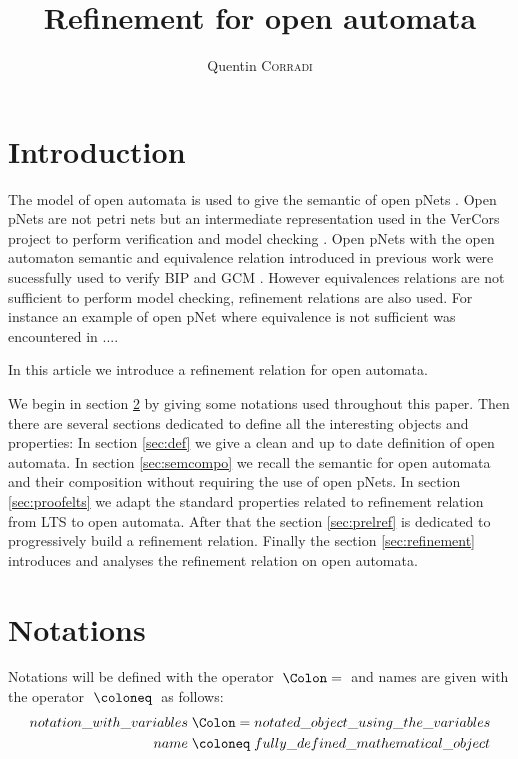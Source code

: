 \documentclass{article}
\title{Refinement for open automata}
\author{Quentin \textsc{Corradi}}
\begin{document}
\maketitle

\section{Introduction}
The model of open automata is used to give the semantic of open pNets \cite{2007.10770}.
Open pNets are not petri nets but an intermediate representation used in the VerCors project to perform verification and model checking \cite{henrio:01252323}.
Open pNets with the open automaton semantic and equivalence relation introduced in previous work \cite{2007.10770} were sucessfully used to verify BIP and GCM \cite{qin:01823507, ameurboulifa:01526055}.
However equivalences relations are not sufficient to perform model checking, refinement relations are also used.
For instance an example of open pNet where equivalence is not sufficient was encountered in ....

In this article we introduce a refinement relation for open automata.

We begin in section \ref{sec:notations} by giving some notations used throughout this paper.
Then there are several sections dedicated to define all the interesting objects and properties:
In section \ref{sec:def} we give a clean and up to date definition of open automata.
In section \ref{sec:semcompo} we recall the semantic for open automata and their composition without requiring the use of open pNets.
In section \ref{sec:proofelts} we adapt the standard properties related to refinement relation from LTS to open automata.
After that the section \ref{sec:prelref} is dedicated to progressively build a refinement relation.
Finally the section \ref{sec:refinement} introduces and analyses the refinement relation on open automata.


\section{Notations}\label{sec:notations}
Notations will be defined with the operator \(\defnotation\) and names are given with the operator \(\defobject\) as follows:
\begin{align*}
	notation\_with\_variables & \defnotation notated\_object\_using\_the\_variables \\
	name & \defobject fully\_defined\_mathematical\_object
\end{align*}
\end{document}
